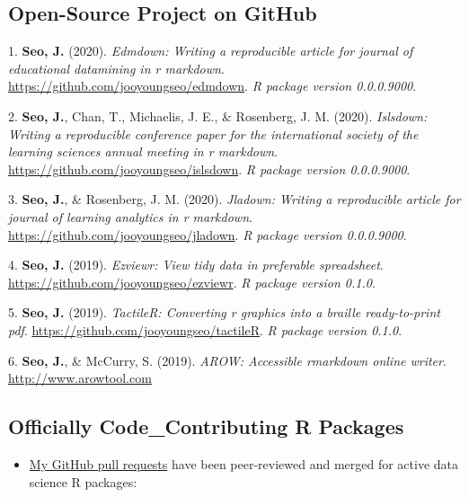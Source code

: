 \documentclass[11pt,a4paper,]{awesome-cv}
\providecommand{\tightlist}{%
	\setlength{\itemsep}{0pt}\setlength{\parskip}{0pt}}
\begin{document}
\newpage

\hypertarget{open-source-project-on-github}{%
\subsection{Open-Source Project on
GitHub}\label{open-source-project-on-github}}

\hypertarget{bibliography}{}
\leavevmode\hypertarget{ref-R-edmdown}{}%
1. \textbf{Seo, J.} (2020). \emph{Edmdown: Writing a reproducible
article for journal of educational datamining in r markdown}.
\url{https://github.com/jooyoungseo/edmdown}. \emph{R package version
0.0.0.9000}.

\leavevmode\hypertarget{ref-R-islsdown}{}%
2. \textbf{Seo, J.}, Chan, T., Michaelis, J. E., \& Rosenberg, J. M.
(2020). \emph{Islsdown: Writing a reproducible conference paper for the
international society of the learning sciences annual meeting in r
markdown}. \url{https://github.com/jooyoungseo/islsdown}. \emph{R
package version 0.0.0.9000}.

\leavevmode\hypertarget{ref-R-jladown}{}%
3. \textbf{Seo, J.}, \& Rosenberg, J. M. (2020). \emph{Jladown: Writing
a reproducible article for journal of learning analytics in r markdown}.
\url{https://github.com/jooyoungseo/jladown}. \emph{R package version
0.0.0.9000}.

\leavevmode\hypertarget{ref-R-ezviewr}{}%
4. \textbf{Seo, J.} (2019). \emph{Ezviewr: View tidy data in preferable
spreadsheet}. \url{https://github.com/jooyoungseo/ezviewr}. \emph{R
package version 0.1.0}.

\leavevmode\hypertarget{ref-R-tactileR}{}%
5. \textbf{Seo, J.} (2019). \emph{TactileR: Converting r graphics into a
braille ready-to-print pdf}.
\url{https://github.com/jooyoungseo/tactileR}. \emph{R package version
0.1.0}.

\leavevmode\hypertarget{ref-webrender}{}%
6. \textbf{Seo, J.}, \& McCurry, S. (2019). \emph{AROW: Accessible
rmarkdown online writer}. \url{http://www.arowtool.com}

\hypertarget{officially-code_contributing-r-packages}{%
\subsection{Officially Code\_Contributing R
Packages}\label{officially-code_contributing-r-packages}}

\begin{itemize}
\tightlist
\item
  \href{https://github.com/pulls?q=is\%3Apr+author\%3Ajooyoungseo+archived\%3Afalse+is\%3Aclosed}{My
  GitHub pull requests} have been peer-reviewed and merged for active
  data science R packages:
\end{itemize}
\end{document}
